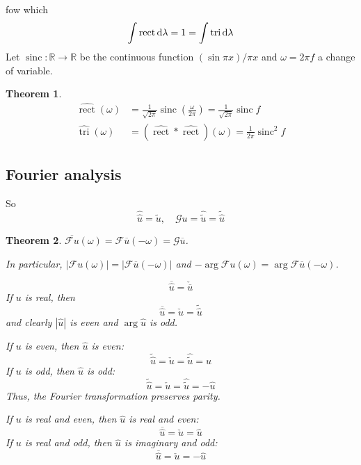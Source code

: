 \documentclass[11pt, a4paper, openany]{book}
\newtheorem{thm}{Theorem}\newtheorem{lem}{Lemma}\newtheorem{crl}{Corollary}
\theoremstyle{definition}
\begin{document}
    fow which 
    \[
        \int \operatorname{rect} \odif\lambda=1=\int \operatorname{tri}\odif\lambda
    \]
    Let $\operatorname{sinc}:\mathbb{R}\rightarrow \mathbb{R}$ be the continuous function $(\sin \pi x)/\pi x$ and $\omega=2\pi f$ a change of variable.
    \begin{thm}
        \begin{align*}
            \widehat{\operatorname{rect}}(\omega)&=\frac{1}{\sqrt{2\pi}}\operatorname{sinc}\left(\frac{\omega}{2\pi}\right)=\frac{1}{\sqrt{2\pi}}\operatorname{sinc}f\\
            \widehat{\operatorname{tri}}(\omega)&=(\widehat{\operatorname{rect}}*\widehat{\operatorname{rect}})(\omega)=\frac{1}{2\pi}\operatorname{sinc}^2f
        \end{align*}
    \end{thm}
\subsection{Fourier analysis}
    So
    \[
        \widehat{\widehat{u}}=\widetilde{u},\quad \mathcal{G}u=\widehat{\widetilde{u}}=\widetilde{\widehat{u}}
    \]
    \begin{thm}
        $\overline{\mathcal{F}u}(\omega)=\mathcal{F}\overline{u}(-\omega)=\mathcal{G}\overline{u}$.

        In particular, $|\mathcal{F}u(\omega)|=|\mathcal{F}\overline{u}(-\omega)|$ and $-\arg {\mathcal{F}u}(\omega)=\arg \mathcal{F}\overline{u}(-\omega)$.

        \[
            \overline{\widehat{u}}=\check{\overline{u}}
        \]
        If $u$ is real, then
        \[
            \overline{\widehat{u}}=\check{u}=\widetilde{\widehat{u}}
        \]
        and clearly $|\widehat{u}|$ is even and $\operatorname{arg} \widehat{u}$ is odd.
        
        If $u$ is even, then $\widehat{u}$ is even:
        \[
            \widetilde{\widehat{u}}=\check{u}=\widehat{\widetilde{u}}=\widehat{u}
        \]
        If $u$ is odd, then $\widehat{u}$ is odd:
        \[
            \widetilde{\widehat{u}}=\check{u}=\widehat{\widetilde{u}}=-\widehat{u}
        \]
        Thus, the Fourier transformation preserves parity.

        If $u$ is real and even, then $\widehat{u}$ is real and even:
        \[
            \overline{\widehat{u}}=\check{u}=\widehat{u}
        \]
        If $u$ is real and odd, then $\widehat{u}$ is imaginary and odd:
        \[
            \overline{\widehat{u}}=\check{u}=-\widehat{u}
        \]
    \end{thm}
\end{document}
